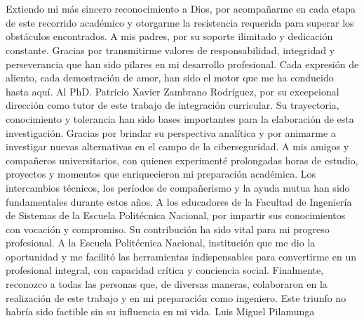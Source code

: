 \newpage
\titlespacing*{\chapter}{0pt}{0pt}{15pt}
\chapter*{}
Extiendo mi más sincero reconocimiento a Dios, por acompañarme en cada etapa de este recorrido académico y otorgarme la resistencia requerida para superar los obstáculos encontrados.
A mis padres, por su soporte ilimitado y dedicación constante. Gracias por transmitirme valores de responsabilidad, integridad y perseverancia que han sido pilares en mi desarrollo profesional. Cada expresión de aliento, cada demostración de amor, han sido el motor que me ha conducido hasta aquí.
Al PhD. Patricio Xavier Zambrano Rodríguez, por su excepcional dirección como tutor de este trabajo de integración curricular. Su trayectoria, conocimiento y tolerancia han sido bases importantes para la elaboración de esta investigación. Gracias por brindar su perspectiva analítica y por animarme a investigar nuevas alternativas en el campo de la ciberseguridad.
A mis amigos y compañeros universitarios, con quienes experimenté prolongadas horas de estudio, proyectos y momentos que enriquecieron mi preparación académica. Los intercambios técnicos, los períodos de compañerismo y la ayuda mutua han sido fundamentales durante estos años.
A los educadores de la Facultad de Ingeniería de Sistemas de la Escuela Politécnica Nacional, por impartir sus conocimientos con vocación y compromiso. Su contribución ha sido vital para mi progreso profesional.
A la Escuela Politécnica Nacional, institución que me dio la oportunidad y me facilitó las herramientas indispensables para convertirme en un profesional integral, con capacidad crítica y conciencia social.
Finalmente, reconozco a todas las personas que, de diversas maneras, colaboraron en la realización de este trabajo y en mi preparación como ingeniero. Este triunfo no habría sido factible sin su influencia en mi vida.
Luis Miguel Pilamunga